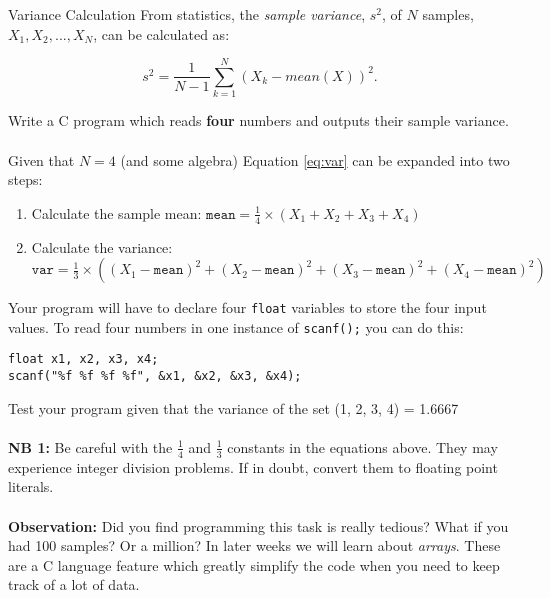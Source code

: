 \documentclass{lab}
\begin{document}
\begin{task}{Variance Calculation}{}
From statistics, the \textit{sample variance}, $s^2$, of $N$ samples, $X_1, X_2, ... , X_N$, can be calculated as:

\begin{equation}\label{eq:var}
s^2 = \frac{1}{N-1}\sum_{k=1}^{N}(X_k - mean(X))^2.
\end{equation}

Write a C program which reads \textbf{four} numbers and outputs their sample variance.
\\ \\
Given that $N = 4$ (and some algebra) Equation \ref{eq:var} can be expanded into two steps:

\begin{enumerate}
\item Calculate the sample mean: $\texttt{mean} = \frac{1}{4} \times \left( X_1 + X_2 + X_3 + X_4 \right)$
\item Calculate the variance: $\texttt{var} = \frac{1}{3} \times ((X_1-\texttt{mean})^2 + (X_2-\texttt{mean})^2 + (X_3-\texttt{mean})^2 + (X_4-\texttt{mean})^2)$
\end{enumerate}

Your program will have to declare four \texttt{float} variables to store the four input values. To read four numbers in one instance of \texttt{scanf();} you can do this:

\begin{lstlisting}[style=CStyle]
float x1, x2, x3, x4;
scanf("%f %f %f %f", &x1, &x2, &x3, &x4);
\end{lstlisting}

Test your program given that the variance of the set (1, 2, 3, 4) = 1.6667
\\ \\
\textbf{NB 1:} Be careful with the $\frac{1}{4}$ and $\frac{1}{3}$ constants in the equations above. They may experience integer division problems. If in doubt, convert them to floating point literals.
\\ \\
\textbf{Observation:} Did you find programming this task is really tedious? What if you had 100 samples? Or a million? In later weeks we will learn about \textit{arrays}. These are a C language feature which greatly simplify the code when you need to keep track of a lot of data.
\end{task}
\end{document}
